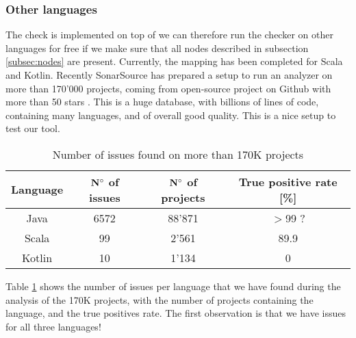 \subsubsection{Other languages}
\label{subsubsec:other_languages}
The check is implemented on top of \slang{} we can therefore run the checker on other languages for free if we make sure that all nodes described in subsection \ref{subsec:nodes} are present. 
Currently, the mapping has been completed for Scala and Kotlin.
Recently SonarSource has prepared a setup to run an analyzer on more than 170'000 projects, coming from open-source project on Github with more than 50 stars \cite{sourced:2019:Online}. 
This is a huge database, with billions of lines of code, containing many languages, and of overall good quality. 
This is a nice setup to test our tool.

\begin{table}[h]
	\centering
	\caption{Number of issues found on more than 170K projects}
	\label{table:large_scale_issues}
	\begin{tabular}{|c|c|c|c|}
		\hline
		\bf Language & \bf $\bf N^{\circ}$ of issues & \bf $\bf N^{\circ}$  of projects & \bf True positive rate [\%] \\ \hline
		Java & 6572 & 88'871 & $>$99 ? \\
		Scala & 99 & 2'561 & 89.9 \\
		Kotlin & 10 & 1'134 & 0 \\ \hline
	\end{tabular}
\end{table}

Table \ref{table:large_scale_issues} shows the number of issues per language that we have found during the analysis of the 170K projects, with the number of projects containing the language, and the true positives rate.
The first observation is that we have issues for all three languages!

